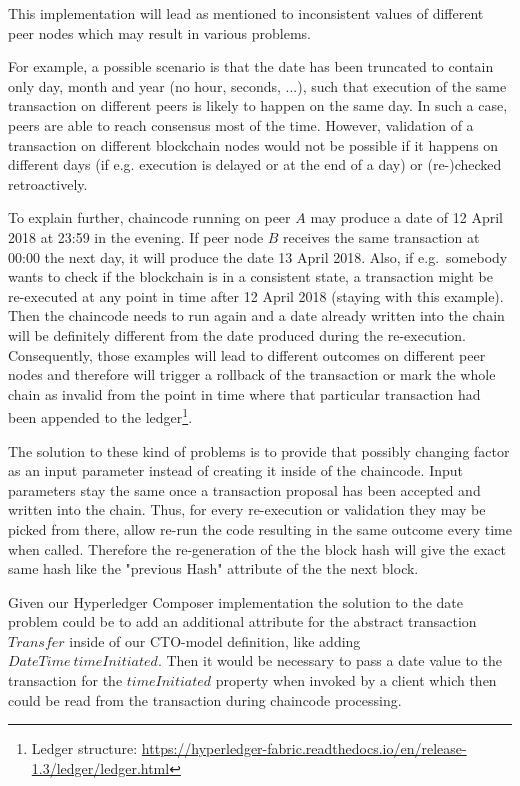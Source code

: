 This implementation will lead as mentioned to inconsistent values of different peer nodes which may result in various problems.

For example, a possible scenario is that the date has been truncated to contain only day, month and year (no hour, seconds, ...), such that execution of the same transaction on different peers is likely to happen on the same day. In such a case, peers are able to reach consensus most of the time. However, validation of a transaction on different blockchain nodes would not be possible if it happens on different days (if e.g. execution is delayed or at the end of a day) or (re-)checked retroactively.

To explain further, chaincode running on peer $A$ may produce a date of 12 April 2018 at 23:59 in the evening. If peer node $B$ receives the same transaction at 00:00 the next day, it will produce the date 13 April 2018. Also, if e.g.\ somebody wants to check if the blockchain is in a consistent state, a transaction might be re-executed at any point in time after 12 April 2018 (staying with this example). Then the chaincode needs to run again and a date already written into the chain will be definitely different from the date produced during the re-execution. Consequently, those examples will lead to different outcomes on different peer nodes and therefore will trigger a rollback of the transaction or mark the whole chain as invalid from the point in time where that particular transaction had been appended to the ledger\footnote{Ledger structure: \url{https://hyperledger-fabric.readthedocs.io/en/release-1.3/ledger/ledger.html}}.

The solution to these kind of problems is to provide that possibly changing factor as an input parameter instead of creating it inside of the chaincode. Input parameters stay the same once a transaction proposal has been accepted and written into the chain. Thus, for every re-execution or validation they may be picked from there, allow re-run the code resulting in the same outcome every time when called. Therefore the re-generation of the the block hash will give the exact same hash like the "previous Hash" attribute of the the next block.

Given our Hyperledger Composer implementation the solution to the date problem could be to add an additional attribute for the abstract transaction $Transfer$ inside of our CTO-model definition, like adding $DateTime\ timeInitiated$. Then it would be necessary to pass a date value to the transaction for the $timeInitiated$ property when invoked by a client which then could be read from the transaction during chaincode processing.


